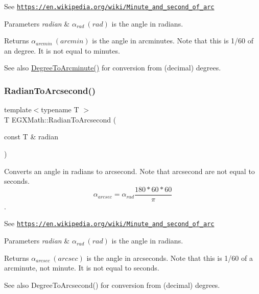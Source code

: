 See \href{https://en.wikipedia.org/wiki/Minute_and_second_of_arc}{\tt https\+://en.\+wikipedia.\+org/wiki/\+Minute\+\_\+and\+\_\+second\+\_\+of\+\_\+arc} 
\begin{DoxyParams}{Parameters}
{\em radian} & $\alpha_{rad}\ (rad)$ is the angle in radians. \\
\hline
\end{DoxyParams}
\begin{DoxyReturn}{Returns}
$\alpha_{arcmin}\ (arcmin)$ is the angle in arcminutes. Note that this is 1/60 of an degree. It is not equal to minutes. 
\end{DoxyReturn}
\begin{DoxySeeAlso}{See also}
\mbox{\hyperlink{group___e_g_x_math-_angle_conversions-_degree_ga8abf327dc5f52907b2c881999e9cc43e}{Degree\+To\+Arcminute()}} for conversion from (decimal) degrees. 
\end{DoxySeeAlso}
\mbox{\label{group___e_g_x_math-_angle_conversions-_radian_ga2f952f6675a0fc54bf72bfe4e3d2664a}} 
\subsubsection{\texorpdfstring{Radian\+To\+Arcsecond()}{RadianToArcsecond()}}
{\footnotesize\ttfamily template$<$typename T $>$ \\
T E\+G\+X\+Math\+::\+Radian\+To\+Arcsecond (\begin{DoxyParamCaption}\item[{const T \&}]{radian }\end{DoxyParamCaption})}



Converts an angle in radians to arcsecond. Note that arcsecond are not equal to seconds. \[\alpha_{arcsec}=\alpha_{rad}\frac{180 * 60 * 60}{\pi}\]. 

See \href{https://en.wikipedia.org/wiki/Minute_and_second_of_arc}{\tt https\+://en.\+wikipedia.\+org/wiki/\+Minute\+\_\+and\+\_\+second\+\_\+of\+\_\+arc} 
\begin{DoxyParams}{Parameters}
{\em radian} & $\alpha_{rad}\ (rad)$ is the angle in radians. \\
\hline
\end{DoxyParams}
\begin{DoxyReturn}{Returns}
$\alpha_{arcsec}\ (arcsec)$ is the angle in arcseconds. Note that this is 1/60 of a arcminute, not minute. It is not equal to seconds. 
\end{DoxyReturn}
\begin{DoxySeeAlso}{See also}
Degree\+To\+Arcsecond() for conversion from (decimal) degrees. 
\end{DoxySeeAlso}
\mbox{\label{group___e_g_x_math-_angle_conversions-_radian_ga4d845b171148481aa7e85018d6dad035}} 
